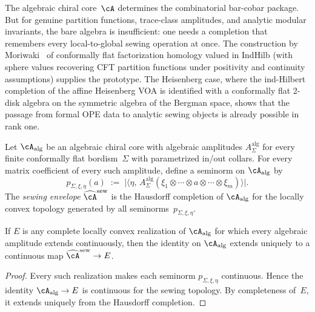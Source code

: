 The algebraic chiral core~$\cA$ determines the combinatorial
bar-cobar package. But for genuine partition functions, trace-class
amplitudes, and analytic modular invariants, the bare algebra is
insufficient: one needs a completion that remembers every local-to-global
sewing operation at once. The construction by
Moriwaki~\cite{Moriwaki26a,Moriwaki26b} of conformally flat
factorization homology valued in $\mathrm{IndHilb}$ (with sphere
values recovering CFT partition functions under positivity and
continuity assumptions) supplies the prototype. The Heisenberg
case, where the ind-Hilbert completion of the affine Heisenberg VOA
is identified with a conformally flat 2-disk algebra on the symmetric
algebra of the Bergman space, shows that the passage from formal OPE
data to analytic sewing objects is already possible in rank one.

\begin{definition}
\label{def:sewing-envelope-frontier}
Let $\cA_{\mathrm{alg}}$ be an algebraic chiral core with
algebraic amplitudes
$A^{\mathrm{alg}}_\Sigma$ for every finite conformally flat
bordism~$\Sigma$ with parametrized in/out collars. For every
matrix coefficient of every such amplitude, define a seminorm on
$\cA_{\mathrm{alg}}$ by
\begin{equation}\label{eq:sewing-seminorm}
p_{\Sigma,\xi,\eta}(a)
\;:=\;
\bigl|
\langle \eta,\,
 A^{\mathrm{alg}}_\Sigma(\xi_1 \otimes \cdots \otimes a
 \otimes \cdots \otimes \xi_m)
\rangle
\bigr|.
\end{equation}
The \emph{sewing envelope} $\widehat{\cA}^{\mathrm{sew}}$ is the
Hausdorff completion of $\cA_{\mathrm{alg}}$ for the locally convex
topology generated by all seminorms~$p_{\Sigma,\xi,\eta}$.
\end{definition}

\begin{proposition}
\label{prop:sewing-envelope-universal}
If $E$ is any complete locally convex realization of
$\cA_{\mathrm{alg}}$ for which every algebraic amplitude extends
continuously, then the identity on $\cA_{\mathrm{alg}}$ extends
uniquely to a continuous map
$\widehat{\cA}^{\mathrm{sew}} \to E$.
\end{proposition}

\begin{proof}
Every such realization makes each seminorm $p_{\Sigma,\xi,\eta}$
continuous. Hence the identity
$\cA_{\mathrm{alg}} \to E$ is continuous for the sewing topology.
By completeness of~$E$, it extends uniquely from the Hausdorff
completion.
\end{proof}

